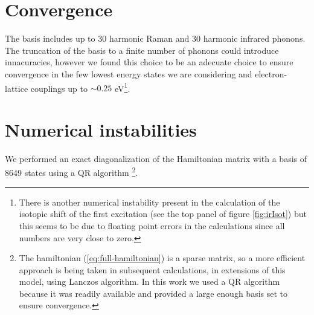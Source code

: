 \section{Convergence}
\label{sec:convergence}

The basis includes up to 30 harmonic Raman and 30 harmonic infrared phonons. 
The  truncation of the basis to a finite number of phonons could introduce innacuracies, however we found this choice to be an adecuate choice to ensure convergence in the few lowest energy states we are considering and electron-lattice couplings up to $\sim0.25$ eV\footnote{There is another numerical instability present in the calculation of the isotopic shift of the first excitation (see the top panel of figure \ref{fig:irIsot}) but this seems to be due to floating point errors in the calculations since all numbers are very close to zero.}.

\section{Numerical instabilities}
\label{sec:numericalInstabilities}

We performed an exact diagonalization of the Hamiltonian matrix with a basis of 8649 states using a QR algorithm \cite{eigenweb}\footnote{The hamiltonian (\ref{eq:full-hamiltonian}) is a sparse matrix, so a more efficient approach is being taken in subsequent calculations, in extensions of this model, using Lanczos algorithm. In this work we used a QR algorithm because it was readily available and provided a large enough basis set to ensure convergence.}.

